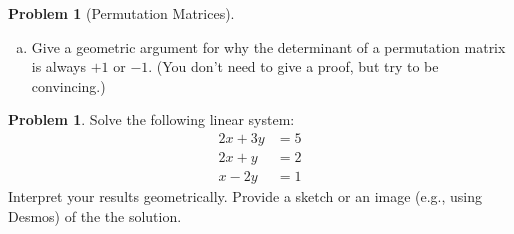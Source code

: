 \documentclass[10pt]{article}
\theoremstyle{definition}
\newtheorem{problem}[theorem]{Problem}
\newcommand{\1}[1]{\textbf{1}_{\left[#1\right]}} %
\begin{document}
\begin{problem}[Permutation Matrices]
\begin{enumerate}[(a)]
    \item Give a geometric argument for why the determinant of a permutation
    matrix is always $+1$ or $-1$. (You don't need to give a proof, but try to
    be convincing.)


  \end{enumerate}
\end{problem}


\begin{problem}
  Solve the following linear system:
  \begin{align*}
    2x+3y&=5\\
    2x+y&=2\\
    x-2y&=1
  \end{align*}
  Interpret your results geometrically. Provide a sketch or an image (e.g.,
  using Desmos) of the the solution.
\end{problem}
\end{document}
